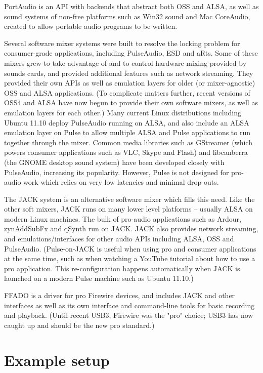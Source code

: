 \documentclass[oneside,english]{scrbook}
\begin{document}
PortAudio is an API with backends that abstract both OSS and ALSA, as well as sound systems of non-free platforms such as Win32 sound and Mac CoreAudio, created to allow portable audio programs to be written.  

Several software mixer systems were built to resolve the locking problem for consumer-grade applications, including PulseAudio, ESD and aRts.  Some of these mixers grew to take advantage of and to control hardware mixing provided by sounds cards, and provided additional features such as network streaming.  They provided their own APIs as well as emulation layers for older (or mixer-agnostic) OSS and ALSA applications.  (To complicate matters further, recent versions of OSS4 and ALSA have now begun to provide their own software mixers, as well as emulation layers for each other.)  Many current Linux distributions including Ubuntu 11.10 deploy PulseAudio running on ALSA, and also include an ALSA emulation layer on Pulse to allow multiple ALSA and Pulse applications to run together through the mixer.  Common media libraries such as GStreamer (which powers consumer applications such as VLC, Skype and Flash) and libcanberra (the GNOME desktop sound system) have been developed closely with PulseAudio, increasing its popularity.  However, Pulse is not designed for pro-audio work which relies on very low latencies and minimal drop-outs.

The JACK system is an alternative software mixer which fills this need.  Like the other soft mixers, JACK runs on many lower level platforms -- usually ALSA on modern Linux machines.  The bulk of pro-audio applications such as Ardour, zynAddSubFx and qSynth run on JACK.  JACK also provides network streaming, and emulations/interfaces for other audio APIs including ALSA, OSS and PulseAudio.  (Pulse-on-JACK is useful when using pro and consumer applications at the same time, such as when watching a YouTube tutorial about how to use a pro application.  This re-configuration happens automatically when JACK is launched on a modern Pulse machine such as Ubuntu 11.10.)

FFADO is a driver for pro Firewire devices, and includes JACK and other interfaces as well as its own interface and command-line tools for basic recording and playback.  (Until recent USB3, Firewire was the "pro" choice; USB3 has now caught up and should be the new pro standard.)

\section{Example setup}
\end{document}
